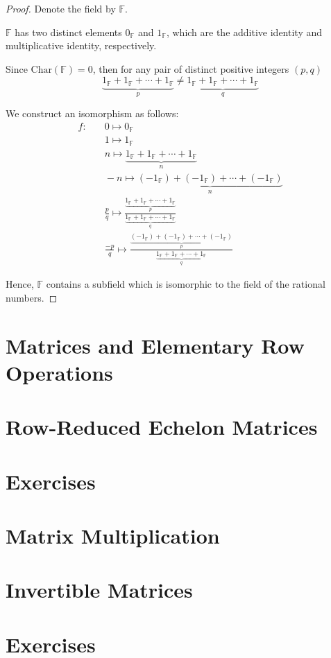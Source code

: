 \begin{proof}
	Denote the field by $\mathbb{F}$.

	$\mathbb{F}$ has two distinct elements $0_{\mathbb{F}}$ and $1_{\mathbb{F}}$, which are the additive identity and multiplicative identity, respectively.

	Since $\text{Char}(\mathbb{F}) = 0$, then for any pair of distinct positive integers $(p, q)$
	\[
		\underbrace{1_{\mathbb{F}} + 1_{\mathbb{F}} + \cdots + 1_{\mathbb{F}}}_{p} \ne \underbrace{1_{\mathbb{F}} + 1_{\mathbb{F}} + \cdots + 1_{\mathbb{F}}}_{q}
	\]

	We construct an isomorphism as follows:
	\[
		\begin{split}
			f:&\quad 0 \mapsto 0_{\mathbb{F}} \\
			&\quad 1 \mapsto 1_{\mathbb{F}} \\
			&\quad n \mapsto \underbrace{1_{\mathbb{F}} + 1_{\mathbb{F}} + \cdots + 1_{\mathbb{F}}}_{n} \\
			&\quad -n \mapsto \underbrace{(-1_{\mathbb{F}}) + (-1_{\mathbb{F}}) + \cdots + (-1_{\mathbb{F}})}_{n} \\
			&\quad \frac{p}{q} \mapsto \frac{\underbrace{1_{\mathbb{F}} + 1_{\mathbb{F}} + \cdots + 1_{\mathbb{F}}}_{p}}{\underbrace{1_{\mathbb{F}} + 1_{\mathbb{F}} + \cdots + 1_{\mathbb{F}}}_{q}} \\
			&\quad \frac{-p}{q} \mapsto \frac{\underbrace{(-1_{\mathbb{F}}) + (-1_{\mathbb{F}}) + \cdots + (-1_{\mathbb{F}})}_{p}}{\underbrace{1_{\mathbb{F}} + 1_{\mathbb{F}} + \cdots + 1_{\mathbb{F}}}_{q}}
		\end{split}
	\]

    Hence, $\mathbb{F}$ contains a subfield which is isomorphic to the field of the rational numbers.
\end{proof}

\section{Matrices and Elementary Row Operations}

\section{Row-Reduced Echelon Matrices}

\section*{Exercises}

\section{Matrix Multiplication}

\section{Invertible Matrices}

\section*{Exercises}
